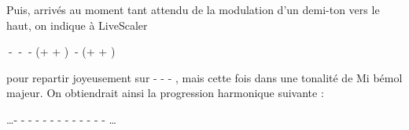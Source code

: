 Puis, arrivés au moment tant attendu de la modulation d'un demi-ton vers le haut, on indique à LiveScaler

\begin{center}
  \LSI $~$-  \LSIV $~$-  \LSV $~$-  (\LSpp + \LSMm +  \LSvi) $~$-  (\LSMod + \LSpp + \LSI)
\end{center}

\noindent pour repartir joyeusement sur \LSI - \LSIV - \LSV - \LSIV, mais cette fois dans une tonalité de Mi bémol majeur. On obtiendrait ainsi la progression harmonique suivante : 

\begin{center}
  \dots -  -  -  -  -  -  -  -  -  -   -  -  - \dots
\end{center}


